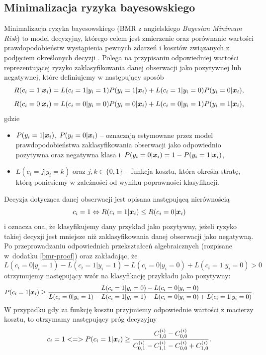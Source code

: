 \documentclass[inzynierska]{pwr_wmat_praca_dyplomowa}
\theoremstyle{plain}
\numberwithin{theorem}{chapter}
\theoremstyle{definition}
\numberwithin{theorem}{chapter}
\begin{document}
\subsection{Minimalizacja ryzyka bayesowskiego}
\label{bmr}
Minimalizacja ryzyka bayesowskiego (BMR z angielskiego \textit{Bayesian Minimum Risk}) to model decyzyjny, którego celem jest zmierzenie oraz porównanie wartości prawdopodobieństw wystąpienia pewnych zdarzeń i kosztów związanych z podjęciem określonych decyzji  \cite{CSCCFD}. Polega na przypisaniu odpowiedniej wartości reprezentującej ryzyko zaklasyfikowania danej obserwacji jako pozytywnej lub negatywnej, które definiujemy w następujący sposób
$$ R(c_i = 1|\boldsymbol{x}_{i}) = L(c_i = 1|y_i = 1)P(y_i = 1|\boldsymbol{x}_{i}) + L(c_i = 1|y_i = 0)P(y_i = 0|\boldsymbol{x}_{i}) \text{,}$$
$$ R(c_i = 0|\boldsymbol{x}_{i}) = L(c_i = 0|y_i = 0)P(y_i = 0|\boldsymbol{x}_{i}) + L(c_i = 0|y_i = 1)P(y_i = 1|\boldsymbol{x}_{i}) \text{,}$$
gdzie
\begin{itemize}
	\item $P(y_i = 1|\boldsymbol{x}_{i})$, $P(y_i = 0|\boldsymbol{x}_{i})$ -- oznaczają estymowane przez model prawdopodobieństwa zaklasyfikowania obserwacji jako odpowiednio pozytywna oraz negatywna klasa i~$P(y_i = 0|\boldsymbol{x}_{i}) = 1 - P(y_i = 1|\boldsymbol{x}_{i})$,
	\item $L(c_i = j|y_i = k)$ oraz $j,k \in \{0, 1\}$ -- funkcja kosztu, która określa stratę, którą poniesiemy w zależności od wyniku poprawności klasyfikacji.
\end{itemize}{}
Decyzja dotycząca danej obserwacji jest opisana następującą nierównością
$$ c_i = 1 \Leftrightarrow R(c_i = 1|\boldsymbol{x}_{i}) \leq R(c_i = 0|\boldsymbol{x}_{i})$$
i oznacza ona, że klasyfikujemy dany przykład jako pozytywny, jeżeli ryzyko takiej decyzji jest mniejsze niż zaklasyfikowania danej obserwacji jako negatywną. 
Po przeprowadzaniu odpowiednich przekształceń algebraicznych (rozpisane w~dodatku \ref{bmr-proof}) oraz zakładając, że 
$$ L(c_i = 0|y_i = 1) - L(c_i = 1|y_i = 1) - L(c_i = 0|y_i = 0) + L(c_i = 1|y_i = 0) > 0 $$ 
otrzymujemy następujący wzór na klasyfikację przykładu jako pozytywny:
$$ P(c_i = 1|\boldsymbol{x}_{i}) \ge \frac{L(c_i = 1|y_i = 0) - L(c_i = 0|y_i = 0)}{L(c_i = 0|y_i = 1) - L(c_i = 1|y_i = 1) - L(c_i = 0|y_i = 0) + L(c_i = 1|y_i = 0)} \text{.}$$
W przypadku gdy za funkcję kosztu przyjmiemy odpowiednie wartości z macierzy kosztu, to otrzymamy następujący próg decyzyjny
$$ c_i = 1 <=> P(c_i = 1|\boldsymbol{x}_{i}) \ge \frac{C^{(i)}_{1,0} - C^{(i)}_{0,0}}{C^{(i)}_{0,1} - C^{(i)}_{1,1} - C^{(i)}_{0,0} + C^{(i)}_{1,0}} \text{.}$$
\end{document}

